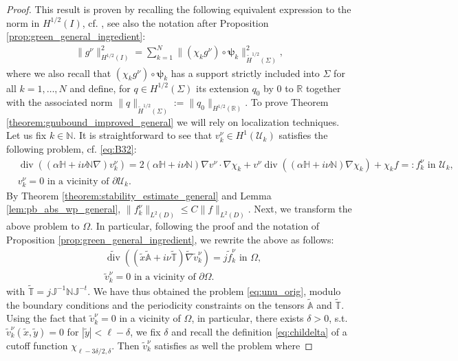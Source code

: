 \documentclass[report]{elsarticle}
\numberwithin{theorem}{section}
\newcommand{\bpsi}{\boldsymbol{\psi}}
\begin{document}
\begin{proof}
This result is proven by recalling the following equivalent expression to the norm in $H^{1/2}(I)$, cf. \cite[(3.29)]{mclean}, see also the notation after Proposition \ref{prop:green_general_ingredient}:
\begin{align}
	\label{eq:gnubound_upper}
	\|g^{\nu}\|^2_{H^{1/2}(I)}= \sum\limits_{k=1}^N\|(\chi_kg^{\nu})\circ {\bpsi}_k\|_{\widetilde{H}^{1/2}(\Sigma)}^2,
\end{align}
where we also recall that $(\chi_kg^{\nu})\circ {\bpsi}_k$ has a support strictly included into $\Sigma$ for all $k=1,\ldots, N$ and define, for $q\in H^{1/2}(\Sigma)$ its extension $q_0$ by $0$ to $\mathbb{R}$ together with the associated norm
$
	\|q\|_{\widetilde{H}^{1/2}(\Sigma)}:=\|q_0\|_{H^{1/2}(\mathbb{R})}.$
To prove Theorem \ref{theorem:gnubound_improved_general} we will rely on localization techniques. Let us fix $k\in \mathbb{N}$. It is straightforward to see that $v^{\nu}_k\in H^1(\mathcal{U}_k)$ satisfies the following problem, cf. \eqref{eq:B32}:
\begin{align*}
	&\operatorname{div}((\alpha\mathbb{H}+i\nu\mathbb{N}\nabla)v^{\nu}_k)=2(\alpha\mathbb{H}+i\nu\mathbb{N})\nabla v^{\nu}\cdot \nabla \chi_k+v^{\nu}\operatorname{div}((\alpha\mathbb{H}+i\nu\mathbb{N})\nabla\chi_k)+\chi_k f =:f^{\nu}_k\text{ in }\mathcal{U}_k,\\
	&v^{\nu}_k=0 \text{ in a vicinity of }\partial \mathcal{U}_k.
\end{align*}
By Theorem \ref{theorem:stability_estimate_general} and Lemma \ref{lem:pb_abs_wp_general}, $
	\|f^{\nu}_k\|_{L^2(D)}\leq C\|f\|_{L^2(D)}.$
Next, we transform the above problem to $\Omega$. In particular, following the proof and the notation of Proposition \ref{prop:green_general_ingredient}, we rewrite the above as follows: 
\begin{align*}
	&\widetilde{\operatorname{div}}((\tilde{x}\widetilde{\mathbb{A}}+i\nu\widetilde{\mathbb{T}})\widetilde{\nabla}\widetilde{v}^{\nu}_k)=j\widetilde{f}^{\nu}_k\text{ in }\Omega,\\
	&\widetilde{v}^{\nu}_k=0 \text{ in a vicinity of }\partial\Omega.
\end{align*}
with $\widetilde{\mathbb{T}}=j\mathbb{J}^{-1}\mathbb{N}\mathbb{J}^{-t}$. We have thus obtained the problem \eqref{eq:unu_orig}, modulo the boundary conditions and the periodicity constraints on the tensors $\widetilde{\mathbb{A}}$ and $\widetilde{\mathbb{T}}$. Using the fact that $\widetilde{v}_k^{\nu}=0$ in a vicinity of $\Omega$, in particular, there exists $\delta>0$, s.t. $\widetilde{v}^{\nu}_k(\tilde{x},\tilde{y})=0$ for $|\tilde{y}|<\ell-\delta$, we fix $\delta$ and recall the definition  \eqref{eq:childelta} of a cutoff function $\chi_{\ell-3\delta/2,\delta}$. Then $\widetilde{v}^{\nu}_k$ satisfies as well the problem where 

\end{proof}
\end{document}
